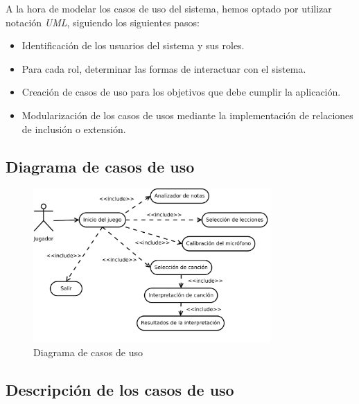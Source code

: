A la hora de modelar los casos de uso del sistema, hemos optado por utilizar
notación \textit{UML}, siguiendo los siguientes pasos:
\begin{itemize}
\item Identificación de los usuarios del sistema y sus roles.
\item Para cada rol, determinar las formas de interactuar con el sistema.
\item Creación de casos de uso para los objetivos que debe cumplir la aplicación.
\item Modularización de los casos de usos mediante la implementación de
  relaciones de inclusión o extensión.
\end{itemize}

\subsection{Diagrama de casos de uso}

\begin{figure}[h!]
  \centering
  \includegraphics[width=0.81\textwidth]{4_analisis/imagen_diagrama_de_casos_de_uso}
  \caption{Diagrama de casos de uso}
\end{figure}


\subsection{Descripción de los casos de uso}

